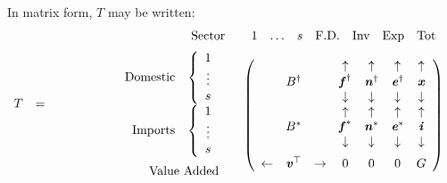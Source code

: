 \documentclass[preprint,authoryear,3p]{elsarticle}
\begin{document}
\noindent In matrix form, $T$ may be written:
$$
\begin{array}{rcc}
T & = & \begin{array}{rc}
\begin{array}{cc} \hspace*{17mm} & \mbox{Sector} \end{array} & \begin{array}{ccccccc} 1 & \mathellipsis & s & \mbox{F.D.} & \mbox{Inv} & \mbox{Exp} & \mbox{Tot} \end{array} \vspace*{2mm} \\
\begin{array}{r}
\begin{array}{rr}
\mbox{Domestic} & \left\{ \begin{array}{c}
1 \\
\vdots \\
s
\end{array} \right. \\
\mbox{Imports} & \left\{ \begin{array}{c}
1 \\
\vdots \\
s \\
\end{array} \right.
\end{array} \vspace*{2mm} \\
\begin{array}{cc} \hspace*{17mm} & \mbox{Value Added} \end{array}
\end{array} &
\left( \begin{array}{ccccccc}
 &  &  & \uparrow & \uparrow & \uparrow & \uparrow \\
 & B^{\dag} & & \textbf{\textit{f}}^\dag & \textbf{\textit{n}}^\dag & \textbf{\textit{e}}^\dag & \textbf{\textit{x}} \\
 &  &  & \downarrow & \downarrow & \downarrow & \downarrow \\
 &  &  & \uparrow & \uparrow & \uparrow & \uparrow \\
 & B^* & & \textbf{\textit{f}}^* & \textbf{\textit{n}}^* & \textbf{\textit{e}}^* & \textbf{\textit{i}} \\
 &  &  & \downarrow & \downarrow & \downarrow & \downarrow \vspace*{2mm} \\
\leftarrow & \textbf{\textit{v}}^\top & \rightarrow & 0 & 0 & 0 & G
\end{array} \right)
\end{array}
\end{array}
$$
\end{document}
